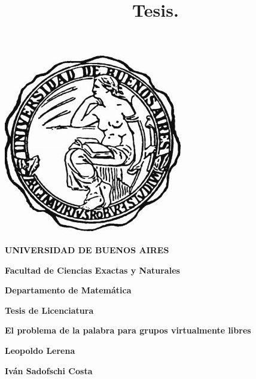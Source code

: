 \documentclass[10pt]{book}
\title{\color{red!55!black} Tesis.}
\date{}
\begin{document}
\thispagestyle{empty}

\begin {center}

\includegraphics[scale=.3]{LogoUBA.jpg}


\medskip
\textbf{\color{astral!40!black} UNIVERSIDAD DE BUENOS AIRES}

\smallskip

\textbf{\color{astral!40!black}Facultad de Ciencias Exactas y Naturales}

\smallskip

\textbf{\color{astral!40!black}Departamento de Matem\'atica}

\vspace{3.5cm}

\textbf{\large \color{astral!40!black} Tesis de Licenciatura}


\vspace{1.5cm}

\textbf{\large \color{astral!40!black} El problema de la palabra para grupos virtualmente libres}

\vspace{1.5cm}


\textbf{\color{astral!40!black} Leopoldo Lerena}

\end {center}


\vspace{1.5cm}

\noindent \textbf{\color{astral!40!black} Iván Sadofschi Costa}


\vspace{3cm}

\tableofcontents
{}
\newpage




	




%



\end{document}
